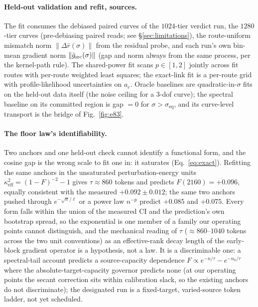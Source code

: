 \paragraph{Held-out validation and refit, sources.} The fit consumes the
debiased paired curves of the $1024$-tier verdict run, the $1280$-tier
curves (pre-debiasing paired reads; see \S\ref{sec:limitations}),
the route-uniform mismatch norm $\|\Delta \bar r(\sigma)\|$ from the
residual probe, and
each run's own bin-mean gradient norm $\|\bar g_{\mathrm{src}}(\sigma)\|$ (gap
and norm always from the same process, per the kernel-path rule). The
shared-power fit scans $p \in [1, 2]$ jointly across fit routes with
per-route weighted least squares; the exact-link fit is a per-route grid
with profile-likelihood uncertainties on $a_e$. Oracle baselines are
quadratic-in-$\sigma$ fits on the held-out data itself (the noise
ceiling for a 3-dof curve); the spectral baseline on its committed
region is gap $= 0$ for $\sigma > \sigma_{\mathrm{eq}}$, and its
curve-level transport is the bridge of Fig.~\ref{fig:e83}.

\paragraph{The floor law's identifiability.} Two anchors and one
held-out check cannot identify a functional form, and the cosine gap is
the wrong scale to fit one in: it saturates (Eq.~\ref{eq:exact}).
Refitting the same anchors in the unsaturated perturbation-energy units
$\kappa_{\mathrm{eff}}^2 = (1-F)^{-2} - 1$ gives $\tau \approx 860$
tokens and predicts $F(2160) = +0.096$, equally consistent with the
measured $+0.092 \pm 0.012$; the same two anchors pushed through
$e^{-\sqrt{n}/\ell}$ or a power law $n^{-p}$ predict $+0.085$ and
$+0.075$. Every form falls within the union of the measured CI and the
prediction's own bootstrap spread, so the exponential is one member of
a family our operating points cannot distinguish, and the mechanical
reading of $\tau$ ($\approx 860$--$1040$ tokens across the two unit
conventions) as an effective-rank decay length of the early-block
gradient operator is a hypothesis, not a law. It is a discriminable
one: a spectral-tail account predicts a source-capacity dependence
$F \propto e^{-n/\tau} - e^{-n_0/\tau}$ where the
absolute-target-capacity governor predicts none (at our operating
points the secant correction sits within calibration slack, so the
existing anchors do not discriminate); the designated run is a
fixed-target, varied-source token ladder, not yet scheduled.

